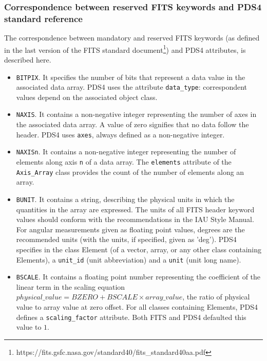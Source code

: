 \subsubsection{Correspondence between reserved FITS keywords and PDS4 standard reference}
\label{sssec:stdfitspds4}
The correspondence between mandatory and reserved FITS keywords (as defined in
the last version of the FITS standard document\footnote{https://fits.gsfc.nasa.gov/standard40/fits\_standard40aa.pdf})
and PDS4 attributes, is described here.
\begin{itemize}
\item{\texttt{BITPIX}.
It specifies the number of bits that represent a data value in
the associated data array.
PDS4 uses the attribute \texttt{data\_type}: correspondent 
values depend on the associated object class.}

\item{\texttt{NAXIS}.
It contains a non-negative integer representing the number of axes in
the associated data array.
A value of zero signifies that no data follow the header.
PDS4 uses \texttt{axes}, always defined as a non-negative integer.}

\item{\texttt{NAXISn}.
It contains a non-negative integer representing the number of
elements along axis \texttt{n} of a data array.
The \texttt{elements} attribute of the \texttt{Axis\_Array} class provides
the count of the number of elements along an array.}

\item{\texttt{BUNIT}.
It contains a string, describing the physical units in which the quantities
in the array are expressed.
The units of all FITS header keyword values should conform with the recommendations
in the IAU Style Manual.
For angular measurements given as floating point values, degrees are the recommended
units (with the units, if specified, given as 'deg').
PDS4 specifies in the class Element (of a vector, array, or any other class
containing Elements), a \texttt{unit\_id}} (unit abbreviation) and a \texttt{unit}
(unit long name).

\item{\texttt{BSCALE}.
It contains a floating point number representing the coefficient of the linear term
in the scaling equation $physical\_value = BZERO + BSCALE \times array\_value$,
the ratio of physical value to array value at zero offset.
For all classes containing Elements, PDS4 defines a \texttt{scaling\_factor}
attribute. Both FITS and PDS4 defaulted this value to $1$.}


\end{itemize}
